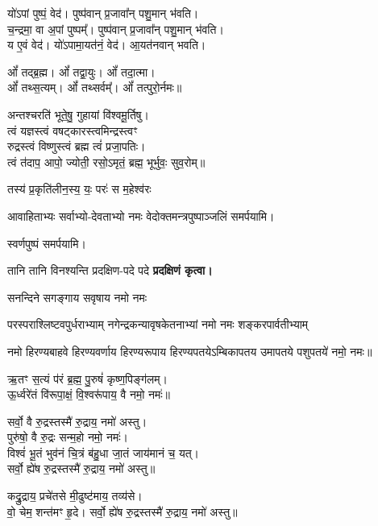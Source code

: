 \begin{center}
यो॑ऽपां पुष्पं॒ वेद॑। पुष्प॑वान् प्र॒जावा᳚न् पशु॒मान् भ॑वति।\\
च॒न्द्रमा॒ वा अ॒पां पुष्पम्᳚। पुष्प॑वान् प्र॒जावा᳚न् पशु॒मान् भ॑वति।\\
य ए॒वं वेद॑। यो॑ऽपामा॒यत॑नं॒ वेद॑। आ॒यत॑नवान् भवति।\medskip

ओं᳚ तद्ब्र॒ह्म। ओं᳚ तद्वा॒युः। ओं᳚ तदा॒त्मा।\\ ओं᳚ तथ्स॒त्यम्‌।
ओं᳚ तथ्सर्वम्᳚‌। ओं᳚ तत्पुरो॒र्नमः॥\medskip

अन्तश्चरति॑ भूते॒षु॒ गुहायां वि॑श्वमू॒र्तिषु। \\
त्वं यज्ञस्त्वं वषट्कारस्त्वमिन्द्रस्त्वꣳ\\ रुद्रस्त्वं विष्णुस्त्वं ब्रह्म त्वं॑ प्रजा॒पतिः। \\
त्वं त॑दाप॒ आपो॒ ज्योती॒ रसो॒ऽमृतं॒ ब्रह्म॒ भूर्भुवः॒ सुव॒रोम्‌॥\medskip

{तस्य॑ प्र॒कृति॑लीन॒स्य॒ यः॒ परः॑ स म॒हेश्व॑रः}
\medskip

आवाहिताभ्यः सर्वाभ्यो-देवताभ्यो नमः वेदोक्तमन्त्रपुष्पाञ्जलिं समर्पयामि।\medskip

स्वर्णपुष्पं समर्पयामि।\medskip


{तानि तानि विनश्यन्ति प्रदक्षिण-पदे पदे}
\textbf{प्रदक्षिणं कृत्वा।}
\medskip


{सनन्दिने सगङ्गाय सवृषाय नमो नमः}

{परस्पराश्लिष्टवपुर्धराभ्याम्}
{नगेन्द्रकन्यावृषकेतनाभ्यां}
{नमो नमः शङ्करपार्वतीभ्याम्}%

नमो हिरण्यबाहवे हिरण्यवर्णाय हिरण्यरूपाय हिरण्यपतये\-ऽम्बिकापतय उमापतये पशुपतये॑ नमो॒ नमः॥%

ऋ॒तꣳ स॒त्यं प॑रं ब्र॒ह्म॒ पु॒रुषं॑ कृष्ण॒पिङ्ग॑लम्।\\ 
ऊ॒र्ध्वरे॑तं वि॑रूपा॒क्षं॒ वि॒श्वरू॑पाय॒ वै नमो॒ नमः॑॥%

सर्वो॒ वै रु॒द्रस्तस्मै॑ रु॒द्राय॒ नमो॑ अस्तु।\\ 
पुरु॑षो॒ वै रु॒द्रः सन्म॒हो नमो॒ नमः॑।\\
विश्वं॑ भू॒तं भुव॑नं चि॒त्रं ब॑हु॒धा जा॒तं जाय॑मानं च॒ यत्।\\
सर्वो॒ ह्ये॑ष रु॒द्रस्तस्मै॑ रु॒द्राय॒ नमो॑ अस्तु॥%


कद्रु॒द्राय॒ प्रचे॑तसे मी॒ढुष्ट॑माय॒ तव्य॑से।\\ 
वो॒ चेम॒ शन्त॑मꣳ हृ॒दे। 
सर्वो॒ ह्ये॑ष रु॒द्रस्तस्मै॑ रु॒द्राय॒ नमो॑ अस्तु॥%



\end{center}
